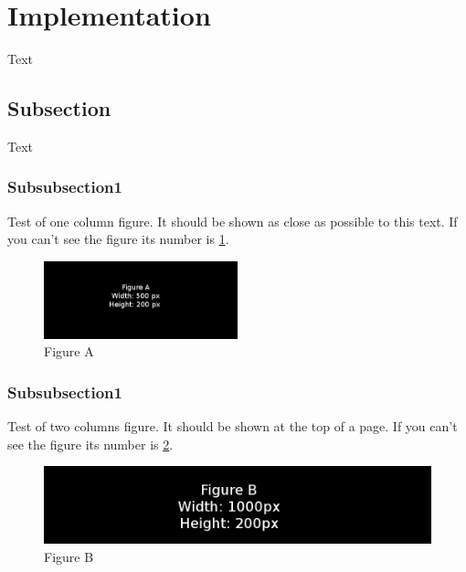 \section{Implementation}\label{sec:implementation}
Text

\subsection{Subsection}
Text
\subsubsection{Subsubsection1}
Test of one column figure. It should be shown as close as possible to this
text. If you can't see the figure its number is \ref{fig:one_column_figure}.
\begin{figure}[h]
    \includegraphics[width=0.5\textwidth]{./figure/figureA.png}
    \caption{Figure A}
    \label{fig:one_column_figure}
\end{figure}

\subsubsection{Subsubsection1}
Test of two columns figure. It should be shown at the top of a page. If you
can't see the figure its number is \ref{fig:two_column_figure}.
\begin{figure}[t]
    \includegraphics[width=1.0\textwidth]{./figure/figureB.png}
    \caption{Figure B}
    \label{fig:two_column_figure}
\end{figure}
